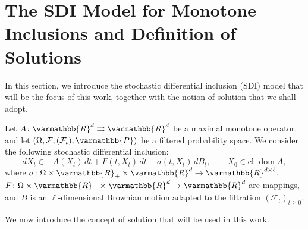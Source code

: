 \documentclass[11pt,reqno]{article}
\let\mathbb=\varmathbb
\newcommand{\R}{\mathbb{R}}
\newcommand{\tto}{\rightrightarrows}
\newcommand{\dom}{\operatorname{dom}}
\newcommand{\cl}{{\text{cl }}}
\newcommand{\1}{\mathds{1}}
\numberwithin{equation}{section}  %
\theoremstyle{plain}
\theoremstyle{definition}
\theoremstyle{remark}
\numberwithin{theorem}{section}
\numberwithin{remark}{section}
\numberwithin{example}{section}
\begin{document}
\section{The SDI Model for Monotone Inclusions and Definition of Solutions}\label{Section3}

In this section, we introduce the stochastic differential inclusion (SDI) model that will be the focus of this work, together with the notion of solution that we shall adopt.  

Let $A \colon \R^d \tto \R^d$ be a maximal monotone operator, and let $(\Omega,\mathcal{F},(\mathcal{F}_t),\mathbb{P})$ be a filtered probability space. We consider the following stochastic differential inclusion:
\begin{equation}\label{MainSDI_General}
    dX_t \in -A(X_t)\,dt+ F(t,X_t)\,dt + \sigma(t,X_t)\,dB_t, 
    \qquad X_0 \in \cl \dom A,
\end{equation}
where $\sigma \colon \Omega\times \R_+ \times \R^d \to \R^{d\times \ell}$, $F\colon \Omega \times \R_+ \times \R^d \to \R^d$ are mappings, and $B$ is an $\ell$-dimensional Brownian motion adapted to the filtration $(\mathcal{F}_t)_{t\geq 0}$.  

We now introduce the concept of solution that will be used in this work.  
\end{document}
